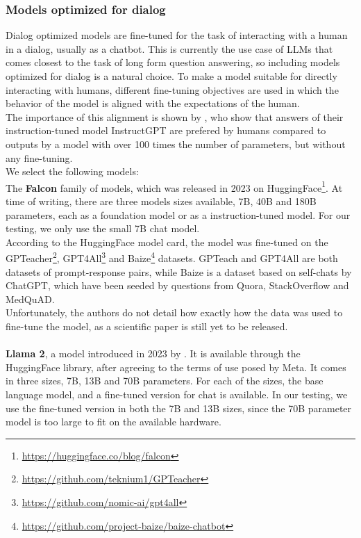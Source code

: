 \subsubsection{Models optimized for dialog}\label{sec:dialog-models}
Dialog optimized models are fine-tuned for the task of interacting with a human in a dialog, usually as a chatbot.
This is currently the use case of LLMs that comes closest to the task of long form question answering, so including models optimized for dialog is a natural choice.
To make a model suitable for directly interacting with humans, different fine-tuning objectives are used in which the behavior of the model is aligned with the expectations of the human.
\\
The importance of this alignment is shown by \cite{ouyang:2022}, who show that answers of their instruction-tuned model InstructGPT are prefered by humans compared to outputs by a model with over 100 times the number of parameters, but without any fine-tuning.
\\
We select the following models:
\\
The \textbf{Falcon} family of models, which was released in 2023 on HuggingFace\footnote{\url{https://huggingface.co/blog/falcon}}.
At time of writing, there are three models sizes available, 7B, 40B and 180B parameters, each as a foundation model or as a instruction-tuned model.
For our testing, we only use the small 7B chat model.
\\
According to the HuggingFace model card, the model was fine-tuned on the GPTeacher\footnote{\url{https://github.com/teknium1/GPTeacher}}, GPT4All\footnote{\url{https://github.com/nomic-ai/gpt4all}} and Baize\footnote{\url{https://github.com/project-baize/baize-chatbot}} datasets.
GPTeach and GPT4All are both datasets of prompt-response pairs, while Baize is a dataset based on self-chats by ChatGPT, which have been seeded by questions from Quora, StackOverflow and MedQuAD.
\\
Unfortunately, the authors do not detail how exactly how the data was used to fine-tune the model, as a scientific paper is still yet to be released.
\\
\\
\textbf{Llama 2}, a model introduced in 2023 by \cite{touvron:2023}.
It is available through the HuggingFace library, after agreeing to the terms of use posed by Meta.
It comes in three sizes, 7B, 13B and 70B parameters.
For each of the sizes, the base language model, and a fine-tuned version for chat is available.
In our testing, we use the fine-tuned version in both the 7B and 13B sizes, since the 70B parameter model is too large to fit on the available hardware.
